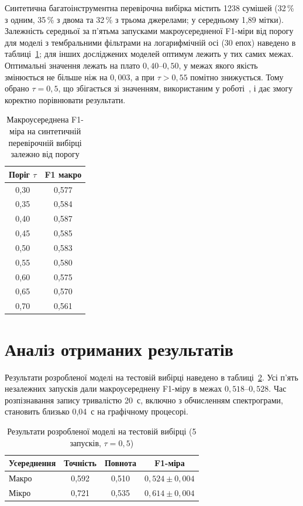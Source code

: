 Синтетична багатоінструментна перевірочна вибірка містить 1238 сумішей
(32\,\% з одним, 35\,\% з двома та 32\,\% з трьома джерелами; у
середньому 1,89 мітки). Залежність середньої за п'ятьма запусками
макроусередненої F1-міри від порогу для моделі з тембральними фільтрами
на логарифмічній осі (30 епох) наведено в таблиці~\ref{tab:thr}; для
інших досліджених моделей оптимум лежить у тих самих межах. Оптимальні значення лежать на
плато $0{,}40$--$0{,}50$, у межах якого якість змінюється не більше ніж
на $0{,}003$, а при $\tau > 0{,}55$ помітно знижується. Тому обрано
$\tau = 0{,}5$, що збігається зі значенням, використаним у
роботі~\cite{han2017}, і дає змогу коректно порівнювати результати.

\begin{table}[H]
\centering
\caption{Макроусереднена F1-міра на синтетичній перевірочній вибірці залежно від порогу}
\label{tab:thr}
\begin{tabular}{|c|c|}
\hline
Поріг $\tau$ & F1 макро \\
\hline
0,30 & 0,577 \\
0,35 & 0,584 \\
0,40 & 0,587 \\
0,45 & 0,585 \\
0,50 & 0,583 \\
0,55 & 0,580 \\
0,60 & 0,575 \\
0,65 & 0,570 \\
0,70 & 0,561 \\
\hline
\end{tabular}
\end{table}

\section{Аналіз отриманих результатів}
\label{sec:results}

Результати розробленої моделі на тестовій вибірці наведено в
таблиці~\ref{tab:main}. Усі п'ять незалежних запусків дали
макроусереднену F1-міру в межах $0{,}518$--$0{,}528$. Час розпізнавання
запису тривалістю 20~с, включно з обчисленням спектрограми, становить
близько 0,04~с на графічному процесорі.

\begin{table}[H]
\centering
\caption{Результати розробленої моделі на тестовій вибірці (5 запусків, $\tau = 0{,}5$)}
\label{tab:main}
\begin{tabular}{|l|c|c|c|}
\hline
Усереднення & Точність & Повнота & F1-міра \\
\hline
Макро & 0,592 & 0,510 & $0{,}524 \pm 0{,}004$ \\
Мікро & 0,721 & 0,535 & $0{,}614 \pm 0{,}004$ \\
\hline
\end{tabular}
\end{table}

